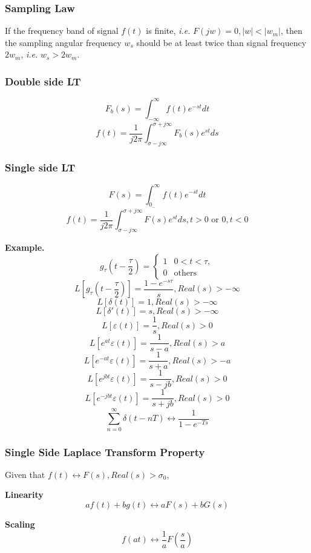  \subsubsection{Sampling Law}
 If the frequency band of signal $f(t)$ is finite, \emph{i.e.} $F(jw) = 0, |w| < |w_m|$,
 then the sampling angular frequency $w_s$ should be at least twice than signal frequency
 $2w_m$, \emph{i.e.} $w_s > 2w_m$.

 \subsubsection{Double side LT}
 \[ F_b(s) = \int_{-\infty}^\infty f(t) e^{-st} dt\]
 \[ f(t) = \frac{1}{j2\pi} \int_{\sigma-j\infty}^{\sigma+j\infty} F_b(s) e^{st} ds\]

 \subsubsection{Single side LT}
 \[ F(s) = \int_{0_-}^\infty f(t) e^{-st} dt\]
 \[ f(t) = \frac{1}{j2\pi} \int_{\sigma-j\infty}^{\sigma+j\infty} F(s)e^{st} ds, t>0 \text{ or } 0, t<0\]

 {\bf Example.}\\
 \[ g_\tau (t - \frac{\tau}{2}) = \left\{ \begin{array}{rl}
		 1 & 0<t<\tau, \\
	 0 & \text{others} \end{array} \right.\]
 \[ \mathit{L}[g_\tau(t-\frac{\tau}{2})] = \frac{1-e^{-s\tau}}{s}, Real(s) > -\infty\]
 \[ \mathit{L}[\delta(t)] = 1, Real(s) > -\infty\]
 \[ \mathit{L}[\delta'(t)] = s, Real(s) > -\infty\]
 \[ \mathit{L}[\varepsilon(t)] = \frac{1}{s}, Real(s) > 0\]
 \[ \mathit{L}[e^{at}\varepsilon(t)] = \frac{1}{s-a}, Real(s) > a\]
 \[ \mathit{L}[e^{-at}\varepsilon(t)] = \frac{1}{s+a}, Real(s) > -a\]
 \[ \mathit{L}[e^{jbt}\varepsilon(t)] = \frac{1}{s-jb}, Real(s) > 0\]
 \[ \mathit{L}[e^{-jbt}\varepsilon(t)] = \frac{1}{s+jb}, Real(s) > 0\]
 \[ \sum_{n=0}^\infty \delta(t-nT) \leftrightarrow \frac{1}{1-e^{-Ts}}\]

 \subsubsection{Single Side Laplace Transform Property}
 Given that $f(t) \leftrightarrow F(s), Real(s) > \sigma_0$,

 {\bf Linearity}
 \[ af(t)+bg(t) \leftrightarrow aF(s) + bG(s)\]
 
 {\bf Scaling}
 \[ f(at) \leftrightarrow \frac{1}{a} F(\frac{s}{a})\]

